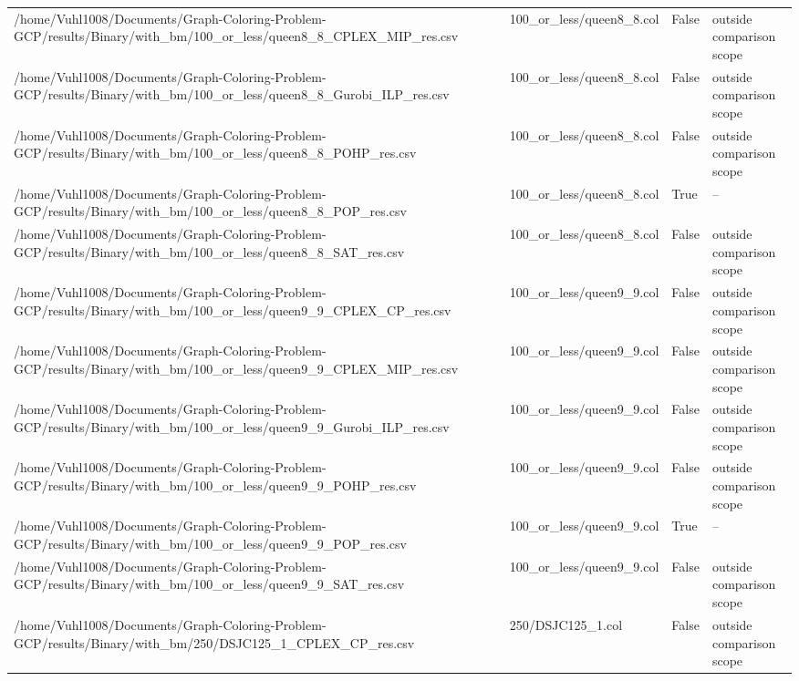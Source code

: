 \begin{table}[htbp]
\begin{tabular}{llll}
/home/Vuhl1008/Documents/Graph-Coloring-Problem-GCP/results/Binary/with\_bm/100\_or\_less/queen8\_8\_CPLEX\_MIP\_res.csv & 100\_or\_less/queen8\_8.col & False & outside comparison scope \\
/home/Vuhl1008/Documents/Graph-Coloring-Problem-GCP/results/Binary/with\_bm/100\_or\_less/queen8\_8\_Gurobi\_ILP\_res.csv & 100\_or\_less/queen8\_8.col & False & outside comparison scope \\
/home/Vuhl1008/Documents/Graph-Coloring-Problem-GCP/results/Binary/with\_bm/100\_or\_less/queen8\_8\_POHP\_res.csv & 100\_or\_less/queen8\_8.col & False & outside comparison scope \\
/home/Vuhl1008/Documents/Graph-Coloring-Problem-GCP/results/Binary/with\_bm/100\_or\_less/queen8\_8\_POP\_res.csv & 100\_or\_less/queen8\_8.col & True & -- \\
/home/Vuhl1008/Documents/Graph-Coloring-Problem-GCP/results/Binary/with\_bm/100\_or\_less/queen8\_8\_SAT\_res.csv & 100\_or\_less/queen8\_8.col & False & outside comparison scope \\
/home/Vuhl1008/Documents/Graph-Coloring-Problem-GCP/results/Binary/with\_bm/100\_or\_less/queen9\_9\_CPLEX\_CP\_res.csv & 100\_or\_less/queen9\_9.col & False & outside comparison scope \\
/home/Vuhl1008/Documents/Graph-Coloring-Problem-GCP/results/Binary/with\_bm/100\_or\_less/queen9\_9\_CPLEX\_MIP\_res.csv & 100\_or\_less/queen9\_9.col & False & outside comparison scope \\
/home/Vuhl1008/Documents/Graph-Coloring-Problem-GCP/results/Binary/with\_bm/100\_or\_less/queen9\_9\_Gurobi\_ILP\_res.csv & 100\_or\_less/queen9\_9.col & False & outside comparison scope \\
/home/Vuhl1008/Documents/Graph-Coloring-Problem-GCP/results/Binary/with\_bm/100\_or\_less/queen9\_9\_POHP\_res.csv & 100\_or\_less/queen9\_9.col & False & outside comparison scope \\
/home/Vuhl1008/Documents/Graph-Coloring-Problem-GCP/results/Binary/with\_bm/100\_or\_less/queen9\_9\_POP\_res.csv & 100\_or\_less/queen9\_9.col & True & -- \\
/home/Vuhl1008/Documents/Graph-Coloring-Problem-GCP/results/Binary/with\_bm/100\_or\_less/queen9\_9\_SAT\_res.csv & 100\_or\_less/queen9\_9.col & False & outside comparison scope \\
/home/Vuhl1008/Documents/Graph-Coloring-Problem-GCP/results/Binary/with\_bm/250/DSJC125\_1\_CPLEX\_CP\_res.csv & 250/DSJC125\_1.col & False & outside comparison scope \\

\end{tabular}
\end{table}
